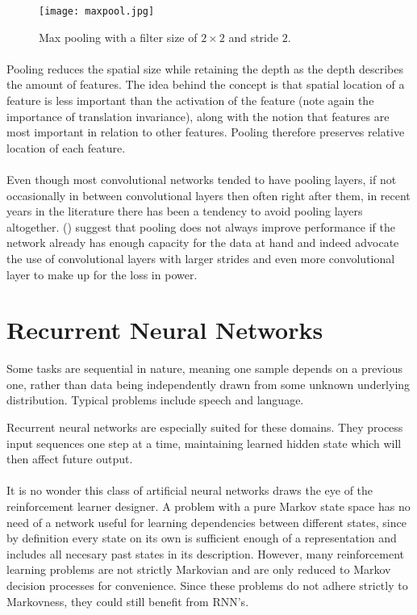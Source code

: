 \begin{figure}[htpb]
  \centering
  \texttt{[image: maxpool.jpg]}
  \caption[Max pooling]{
    Max pooling with a filter size of $2 \times 2$
    and stride $2$.
  }
  \label{fig:maxpool}
\end{figure}

\paragraph{}
Pooling reduces the spatial size
while retaining the depth
as the depth describes the amount of features.
The idea behind the concept
is that spatial location of a feature is less important
than the activation of the feature
(note again the importance of translation invariance),
along with the notion that features are most important
in relation to other features.
Pooling therefore preserves relative location of each feature.

\paragraph{}
Even though most convolutional networks
tended to have pooling layers,
if not occasionally in between convolutional layers
then often right after them,
in recent years in the literature
there has been a tendency to avoid pooling layers altogether.
\citeauthor{Springenberg2015}
(\citeyear{Springenberg2015})
suggest that pooling does not always improve performance
if the network already has enough capacity for the data at hand
and indeed advocate the use of convolutional layers
with larger strides
and even more convolutional layer
to make up for the loss in power.

\section{Recurrent Neural Networks}
\label{sec:rnn}
Some tasks are sequential in nature,
meaning one sample depends on a previous one,
rather than data being independently
drawn from some unknown underlying distribution.
Typical problems include speech and language.

Recurrent neural networks are especially suited
for these domains.
They process input sequences one step at a time,
maintaining learned hidden state which will then
affect future output.

\paragraph{}
It is no wonder this class of artificial neural networks
draws the eye of the reinforcement learner designer.
A problem with a pure Markov state space
has no need of a network useful for learning dependencies between different states,
since by definition every state on its own is sufficient enough of a representation
and includes all necesary past states in its description.
However, many reinforcement learning problems are not strictly Markovian
and are only reduced to Markov decision processes for convenience.
Since these problems do not adhere strictly to Markovness,
they could still benefit from RNN's.

